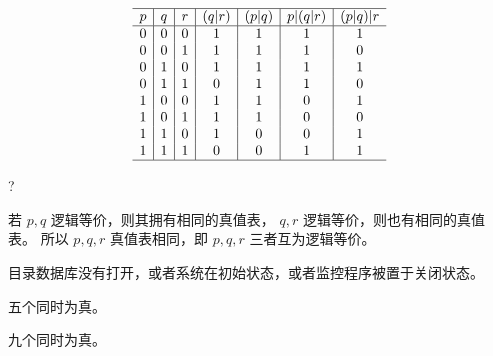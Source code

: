 {{        %
        \begin{practices}
            \begin{table}[H]
                \[
                    \begin{array}{c|c|c|c|c|c|c}
                        \hline
                        p & q & r & (q | r) & (p | q) & p | (q | r) & (p | q) | r \\
                        \hline
                        0 & 0 & 0 & 1 & 1 & 1 & 1 \\
                        0 & 0 & 1 & 1 & 1 & 1 & 0 \\
                        0 & 1 & 0 & 1 & 1 & 1 & 1 \\
                        0 & 1 & 1 & 0 & 1 & 1 & 0 \\
                        1 & 0 & 0 & 1 & 1 & 0 & 1 \\
                        1 & 0 & 1 & 1 & 1 & 0 & 0 \\
                        1 & 1 & 0 & 1 & 0 & 0 & 1 \\
                        1 & 1 & 1 & 0 & 0 & 1 & 1 \\
                        \hline
                   \end{array}
               \]
            \end{table}
        \end{practices}

        \begin{practices}
            ?
        \end{practices}

        \begin{practices}
            若 $p, q$ 逻辑等价，则其拥有相同的真值表， $q, r$ 逻辑等价，则也有相同的真值表。
            所以 $p, q, r$ 真值表相同，即 $p, q, r$ 三者互为逻辑等价。
        \end{practices}

        \begin{practices}
            目录数据库没有打开，或者系统在初始状态，或者监控程序被置于关闭状态。
        \end{practices}

        \begin{practices}
            五个同时为真。
        \end{practices}

        \begin{practices}
            九个同时为真。
        \end{practices}

}}
